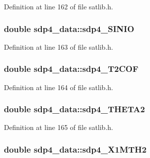 Definition at line 162 of file satlib.\-h.

\hypertarget{structsdp4__data_ae8a456f92f719964531d38f98d05feb5}{
\subsubsection[{sdp4\-\_\-\-S\-I\-N\-I\-O}]{\setlength{\rightskip}{0pt plus 5cm}double sdp4\-\_\-data\-::sdp4\-\_\-\-S\-I\-N\-I\-O}}\label{structsdp4__data_ae8a456f92f719964531d38f98d05feb5}


Definition at line 163 of file satlib.\-h.

\hypertarget{structsdp4__data_af66ee94a547f47c649fa781d16e17cc6}{
\subsubsection[{sdp4\-\_\-\-T2\-C\-O\-F}]{\setlength{\rightskip}{0pt plus 5cm}double sdp4\-\_\-data\-::sdp4\-\_\-\-T2\-C\-O\-F}}\label{structsdp4__data_af66ee94a547f47c649fa781d16e17cc6}


Definition at line 164 of file satlib.\-h.

\hypertarget{structsdp4__data_a161d70530daa8bd4db20b923a1483d42}{
\subsubsection[{sdp4\-\_\-\-T\-H\-E\-T\-A2}]{\setlength{\rightskip}{0pt plus 5cm}double sdp4\-\_\-data\-::sdp4\-\_\-\-T\-H\-E\-T\-A2}}\label{structsdp4__data_a161d70530daa8bd4db20b923a1483d42}


Definition at line 165 of file satlib.\-h.

\hypertarget{structsdp4__data_a7bd4f5f48657acaeb02ecd2b06543f7c}{
\subsubsection[{sdp4\-\_\-\-X1\-M\-T\-H2}]{\setlength{\rightskip}{0pt plus 5cm}double sdp4\-\_\-data\-::sdp4\-\_\-\-X1\-M\-T\-H2}}\label{structsdp4__data_a7bd4f5f48657acaeb02ecd2b06543f7c}


